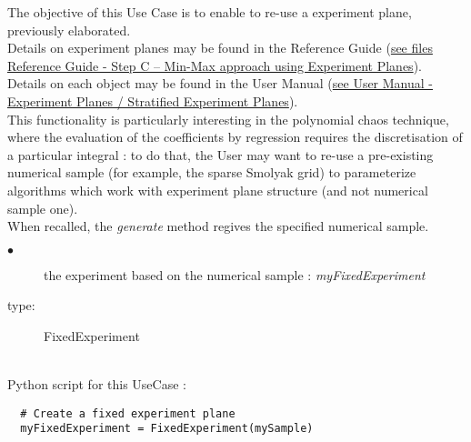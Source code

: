 \renewcommand{\filename}{docUC_MinMax_SpecifiedExperimentPlane.tex}
\renewcommand{\filetitle}{UC : Re-use of a specified numerical sample as experiment plane}

\HeaderIIILevel

\label{fixedExpPlane}



The objective of this Use Case is to enable to re-use a experiment plane, previously elaborated.\\

Details on experiment planes  may be found in the Reference Guide (\href{OpenTURNS_ReferenceGuide.pdf}{see files Reference Guide - Step C -- Min-Max approach using Experiment Planes}).\\

Details on each object may be found in the User Manual  (\href{OpenTURNS_UserManual_TUI.pdf}{see User Manual - Experiment Planes / Stratified Experiment Planes}).\\


This functionality is particularly interesting in the polynomial chaos technique, where the evaluation of the coefficients by regression requires the discretisation of a particular integral : to do that, the User may want to re-use a pre-existing numerical sample (for example, the sparse Smolyak grid) to parameterize algorithms which work with experiment plane structure (and not numerical sample one).\\

When recalled, the {\itshape generate} method regives the specified numerical sample.\\


{
  \begin{description}
  \item[$\bullet$] the experiment based on the numerical sample : {\itshape myFixedExperiment}
  \item[type:] FixedExperiment
  \end{description}
}

\textspace\\
Python script for this UseCase :

\begin{lstlisting}
  # Create a fixed experiment plane
  myFixedExperiment = FixedExperiment(mySample)
\end{lstlisting}







